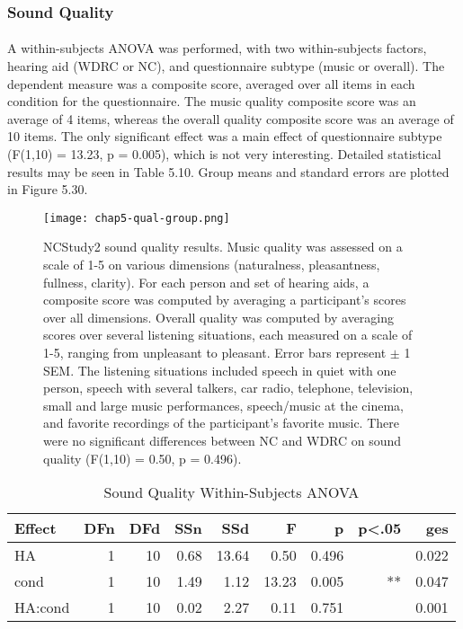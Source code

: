 \subsubsection{Sound Quality}
\paragraph{}A within-subjects ANOVA was performed, with two within-subjects factors, hearing aid (WDRC or NC), and questionnaire subtype (music or overall).  The dependent measure was a composite score, averaged over all items in each condition for the questionnaire.  The music quality composite score was an average of 4 items, whereas the overall quality composite score was an average of 10 items.  The only significant effect was a main effect of questionnaire subtype (F(1,10) = 13.23, p = 0.005), which is not very interesting.  Detailed statistical results may be seen in Table 5.10.  Group means and standard errors are plotted in Figure 5.30.

\begin{figure}[htp]
\begin{center}
\texttt{[image: chap5-qual-group.png]} \\
\caption[NCStudy2 sound quality results]{NCStudy2 sound quality results.  Music quality was assessed on a scale of 1-5 on various dimensions (naturalness, pleasantness, fullness, clarity).  For each person and set of hearing aids, a composite score was computed by averaging a participant's scores over all dimensions.  Overall quality was computed by averaging scores over several listening situations, each measured on a scale of 1-5, ranging from unpleasant to pleasant.  Error bars represent $\pm$ 1 SEM.  The listening situations included speech in quiet with one person, speech with several talkers, car radio, telephone, television, small and large music performances, speech/music at the cinema, and favorite recordings of the participant's favorite music.  There were no significant differences between NC and WDRC on sound quality (F(1,10) = 0.50, p = 0.496).}
\label{chap5-qual-group}
\end{center}
\end{figure}

\begin{table}[htp]
\begin{center}
\begin{tabular}{lrrrrrrrr}
Effect & DFn & DFd  &    SSn &  SSd &      F  &      p & p<.05   &   ges \\
\hline
     HA &  1 & 10 &  0.68 & 13.64 &  0.50 & 0.496 &      & 0.022 \\
   cond &  1 & 10 &  1.49 & 1.12  & 13.23 & 0.005 &    ** & 0.047 \\
HA:cond &  1 & 10 &  0.02 & 2.27  & 0.11 & 0.751  &     & 0.001 \\
\hline
\end{tabular}
\end{center}
\caption{Sound Quality Within-Subjects ANOVA}
\end{table}

